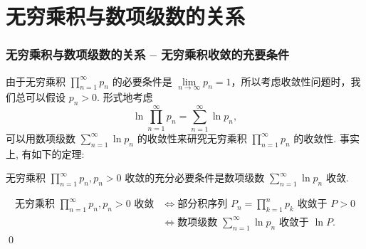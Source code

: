 
\section{无穷乘积与数项级数的关系}


\begin{frame}
\frametitle{无穷乘积与数项级数的关系 -- 无穷乘积收敛的充要条件}

由于无穷乘积 $\prod_{n=1}^\infty p_n$ 的必要条件是 $\lim\limits_{n \to \infty} p_n = 1$，所以考虑收敛性问题时，我们总可以假设 $p_n > 0.$ \alert{形式地}考虑
\[
\ln \prod_{n=1}^\infty p_n = \sum_{n=1}^\infty \ln p_n,
\]
可以用数项级数 $\sum_{n=1}^\infty \ln p_n$ 的收敛性来研究无穷乘积 $\prod_{n=1}^\infty p_n$ 的收敛性. 事实上, 有如下的定理:

\pause

\begin{thm}
无穷乘积 $\prod_{n=1}^\infty p_n, p_n > 0$ 收敛的充分必要条件是数项级数 $\sum_{n=1}^\infty \ln p_n$ 收敛.
\end{thm}

\pause

\startproof[bg=yellow, fg=red]
\vspace{-1em}
\begin{align*}
\text{无穷乘积 $\prod_{n=1}^\infty p_n, p_n > 0$ 收敛} & \Longleftrightarrow \text{部分积序列 $P_n = \prod_{k=1}^n p_k$ 收敛于 $P > 0$} \\
& \Longleftrightarrow \text{数项级数 $\sum_{n=1}^\infty \ln p_n$ 收敛于 $\ln P$}.
\end{align*}
\qed

\end{frame}


